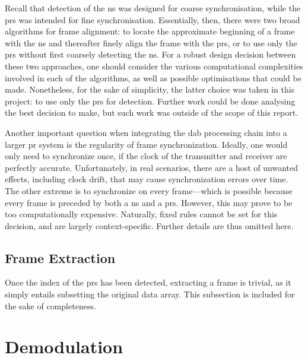 \documentclass[class=report,11pt,crop=false]{standalone}
\begin{document}
Recall that detection of the \gls{ns} was designed for coarse synchronisation, while the \gls{prs} was intended for fine synchronisation. Essentially, then, there were two broad algorithms for frame alignment: to locate the approximate beginning of a frame with the \gls{ns} and thereafter finely align the frame with the \gls{prs}, or to use only the \gls{prs} without first coarsely detecting the \gls{ns}. For a robust design decision between these two approaches, one should consider the various computational complexities involved in each of the algorithms, as well as possible optimisations that could be made. Nonetheless, for the sake of simplicity, the latter choice was taken in this project: to use only the \gls{prs} for detection. Further work could be done analysing the best decision to make, but such work was outside of the scope of this report.

Another important question when integrating the \gls{dab} processing chain into a larger \gls{pr} system is the regularity of frame synchronization. Ideally, one would only need to synchronize once, if the clock of the transmitter and receiver are perfectly accurate. Unfortunately, in real scenarios, there are a host of unwanted effects, including clock drift, that may cause synchronization errors over time. The other extreme is to synchronize on every frame---which is possible because every frame is preceded by both a \gls{ns} and a \gls{prs}. However, this may prove to be too computationally expensive. Naturally, fixed rules cannot be set for this decision, and are largely context-specific. Further details are thus omitted here.

\subsection{Frame Extraction \label{subsect:dab-proc_frame-extract}}
Once the index of the \gls{prs} has been detected, extracting a frame is trivial, as it simply entails subsetting the original data array. This subsection is included for the sake of completeness.

\section{Demodulation \label{sect:dab-proc_demodulate}}
\end{document}
